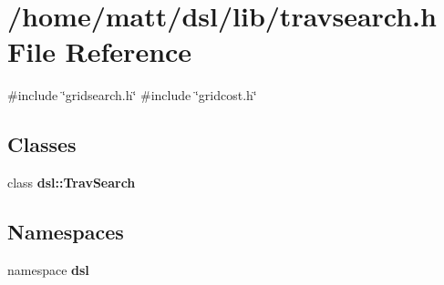 \section{/home/matt/dsl/lib/travsearch.h \-File \-Reference}
\label{travsearch_8h}
{\ttfamily \#include \char`\"{}gridsearch.\-h\char`\"{}}\*
{\ttfamily \#include \char`\"{}gridcost.\-h\char`\"{}}\*
\subsection*{\-Classes}
\begin{DoxyCompactItemize}
\item 
class {\bf dsl\-::\-Trav\-Search}
\end{DoxyCompactItemize}
\subsection*{\-Namespaces}
\begin{DoxyCompactItemize}
\item 
namespace {\bf dsl}
\end{DoxyCompactItemize}
